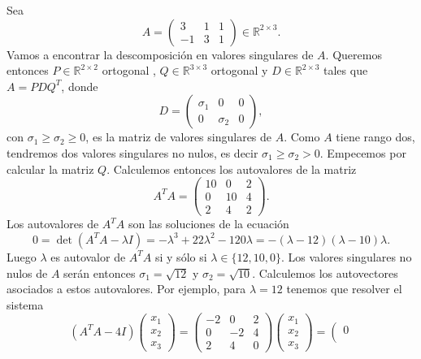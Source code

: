 \begin{example}
	\label{exa:valores_singulares}
	Sea 	
	\[
	A=\left(\begin{array}{ccc}
		3 & 1 & 1\\
		-1 & 3 & 1
	\end{array}\right)\in\mathbb{R}^{2\times3}.
	\]
	Vamos a encontrar la descomposición en valores singulares de $A$. 
	Queremos entonces $P\in\mathbb{R}^{2\times2}$ ortogonal ,
	$Q\in\mathbb{R}^{3\times3}$ ortogonal y $D\in\mathbb{R}^{2\times3}$ tales
	que $A=PDQ^T$, donde 
	\[
	D=\left(\begin{array}{ccc}
		\sigma_{1} & 0 & 0\\
		0 & \sigma_{2} & 0
	\end{array}\right),
	\]
	con $\sigma_{1}\geq\sigma_{2}\geq0$, es la matriz de valores singulares
	de $A$. Como $A$ 
	tiene rango dos, tendremos dos valores singulares no nulos, es decir
	$\sigma_{1}\geq\sigma_{2}>0$. Empecemos por calcular la matriz $Q$.
	Calculemos entonces los autovalores de la matriz 
	\[
	A^{T}A=\begin{pmatrix}
		10 & 0 & 2\\
		0 & 10 & 4\\
		2 & 4 & 2
	\end{pmatrix}.
	\]
	Los autovalores de $A^TA$ son las soluciones de la ecuación
	\[
	0=\det(A^{T}A-\lambda I)=-\lambda^{3}+22\lambda^{2}-120\lambda=-(\lambda-12)(\lambda-10)\lambda.
	\]
	Luego $\lambda$ es autovalor de $A^TA$ si y sólo si
	$\lambda\in\{12,10,0\}$.  Los valores singulares no nulos de $A$ serán
	entonces $\sigma_{1}=\sqrt{12}$ y $\sigma_{2}=\sqrt{10}$. Calculemos los
	autovectores asociados a estos autovalores. Por ejemplo, para $\lambda=12$
	tenemos que resolver el sistema 
	\[
	(A^{T}A-4I)\left(\begin{array}{c}
		x_{1}\\
		x_{2}\\
		x_{3}
	\end{array}\right)=\left(\begin{array}{ccc}
		-2 & 0 & 2\\
		0 & -2 & 4\\
		2 & 4 & 0
	\end{array}\right)\left(\begin{array}{c}
		x_{1}\\
		x_{2}\\
		x_{3}
	\end{array}\right)=\left(\begin{array}{c}
		0\\

\end{array}\]
\end{example}
